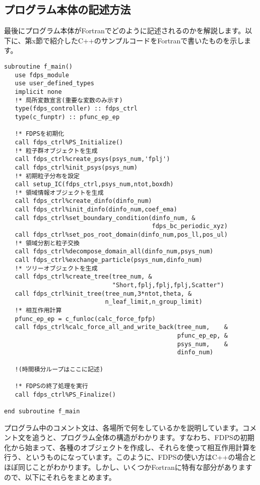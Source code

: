 \documentclass[twocolumn,10pt]{jarticle}
\begin{document}
\subsection{プログラム本体の記述方法}\label{subsec:how_to_implement_main}
最後にプログラム本体がFortranでどのように記述されるのかを解説します。以下に、第x節で紹介したC++のサンプルコードをFortranで書いたものを示します。
{\scriptsize
\begin{verbatim}
subroutine f_main()
   use fdps_module
   use user_defined_types
   implicit none
   !* 局所変数宣言(重要な変数のみ示す)
   type(fdps_controller) :: fdps_ctrl
   type(c_funptr) :: pfunc_ep_ep

   !* FDPSを初期化
   call fdps_ctrl%PS_Initialize()
   !* 粒子群オブジェクトを生成
   call fdps_ctrl%create_psys(psys_num,'fplj')
   call fdps_ctrl%init_psys(psys_num)
   !* 初期粒子分布を設定
   call setup_IC(fdps_ctrl,psys_num,ntot,boxdh)
   !* 領域情報オブジェクトを生成
   call fdps_ctrl%create_dinfo(dinfo_num)
   call fdps_ctrl%init_dinfo(dinfo_num,coef_ema)
   call fdps_ctrl%set_boundary_condition(dinfo_num, &
                                         fdps_bc_periodic_xyz)
   call fdps_ctrl%set_pos_root_domain(dinfo_num,pos_ll,pos_ul)
   !* 領域分割と粒子交換
   call fdps_ctrl%decompose_domain_all(dinfo_num,psys_num)
   call fdps_ctrl%exchange_particle(psys_num,dinfo_num)
   !* ツリーオブジェクトを生成
   call fdps_ctrl%create_tree(tree_num, &
                              "Short,fplj,fplj,fplj,Scatter")
   call fdps_ctrl%init_tree(tree_num,3*ntot,theta, &
                            n_leaf_limit,n_group_limit)
   !* 相互作用計算
   pfunc_ep_ep = c_funloc(calc_force_fpfp)
   call fdps_ctrl%calc_force_all_and_write_back(tree_num,    &
                                                pfunc_ep_ep, &
                                                psys_num,    &
                                                dinfo_num)
                                                
   !(時間積分ループはここに記述)

   !* FDPSの終了処理を実行
   call fdps_ctrl%PS_Finalize()

end subroutine f_main                          
\end{verbatim}
}\noindent
プログラム中のコメント文は、各場所で何をしているかを説明しています。コメント文を追うと、プログラム全体の構造がわかります。すなわち、FDPSの初期化から始まって、各種のオブジェクトを作成し、それらを使って相互作用計算を行う、というものになっています。このように、FDPSの使い方はC++の場合とほぼ同じことがわかります。しかし、いくつかFortranに特有な部分がありますので、以下にそれらをまとめます。
\end{document}
